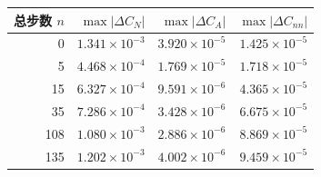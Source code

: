 \begin{tabular}{rrrr}
\toprule
总步数 $n$ & $\max|\Delta C_N|$ & $\max|\Delta C_A|$ & $\max|\Delta C_{nn}|$ \\
\midrule
0 & $1.341\times10^{-3}$ & $3.920\times10^{-5}$ & $1.425\times10^{-5}$ \\
5 & $4.468\times10^{-4}$ & $1.769\times10^{-5}$ & $1.718\times10^{-5}$ \\
15 & $6.327\times10^{-4}$ & $9.591\times10^{-6}$ & $4.365\times10^{-5}$ \\
35 & $7.286\times10^{-4}$ & $3.428\times10^{-6}$ & $6.675\times10^{-5}$ \\
108 & $1.080\times10^{-3}$ & $2.886\times10^{-6}$ & $8.869\times10^{-5}$ \\
135 & $1.202\times10^{-3}$ & $4.002\times10^{-6}$ & $9.459\times10^{-5}$ \\
\bottomrule
\end{tabular}
